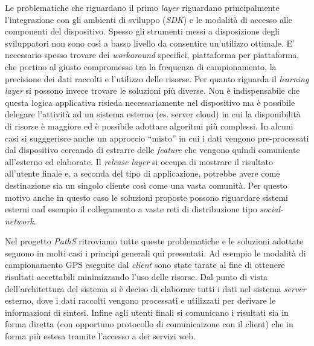 \documentclass[a4paper, 12pt, twoside, openright]{book}
\begin{document}
Le problematiche che riguardano il primo \emph{layer} riguardano principalmente l'integrazione con gli ambienti di sviluppo (\emph{SDK}) e le modalità di accesso alle componenti del dispositivo. Spesso gli strumenti messi a disposizione degli sviluppatori non sono così a basso livello da consentire un'utilizzo ottimale. E' necessario spesso trovare dei \emph{workaround} specifici, piattaforma per piattaforma, che portino al giusto compromesso tra la frequenza di campionamento, la precisione dei dati raccolti e l'utilizzo delle risorse.
Per quanto riguarda il \emph{learning layer} si possono invece trovare le soluzioni più diverse. Non è indispensabile che questa logica applicativa risieda necessariamente nel dispositivo ma è possibile delegare l'attività ad un sistema esterno (es. server cloud) in cui la disponibilità di risorse è maggiore ed è possibile adottare algoritmi più complessi. In alcuni casi si sugggerisce anche un approccio ``misto'' in cui i dati vengono pre-processati dal dispositivo cercando di estrarre delle \emph{feature} che vengono quindi comunicate all'esterno ed elaborate.
Il \emph{release layer} si occupa di mostrare il risultato all'utente finale e, a seconda del tipo di applicazione, potrebbe avere come destinazione sia un singolo cliente così come una vasta comunità. Per questo motivo anche in questo caso le soluzioni proposte possono riguardare sistemi esterni oad esempio il collegamento a vaste reti di distribuzione tipo \emph{social-network}.

Nel progetto \emph{PathS} ritroviamo tutte queste problematiche e le soluzioni adottate seguono in molti casi i principi generali qui presentati. Ad esempio le modalità di campionamento GPS eseguite dal \emph{client} sono state tarate al fine di ottenere risultati accettabili minimizzando l'uso delle risorse. Dal punto di vista dell'architettura del sistema si è deciso di elaborare tutti i dati nel sistema \emph{server} esterno, dove i dati raccolti vengono processati e utilizzati per derivare le informazioni di sintesi. Infine agli utenti finali si comunicano i risultati sia in forma diretta (con opportuno protocollo di comunicaizone con il client) che in forma più estesa tramite l'accesso a dei servizi web.
\end{document}
